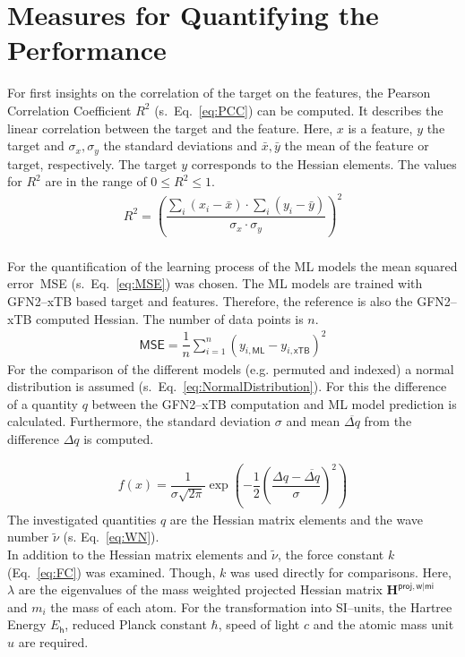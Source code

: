 \section{Measures for Quantifying the Performance}
\label{sec:Methods:Measures}
For first insights on the correlation of the target on the features, the Pearson Correlation Coefficient $R^2$ (s.~Eq.~\eqref{eq:PCC}) can be computed.
It describes the linear correlation between the target and the feature.
Here, $x$ is a feature, $y$ the target and $\sigma_x,\sigma_y$ the standard deviations and $\bar{x},\bar{y}$ the mean of the feature or target, respectively.
The target $y$ corresponds to the Hessian elements.
The values for $R^2$ are in the range of $0 \leq R^2 \leq 1$.
\begin{align}
	\label{eq:PCC}
	R^2 = \left(  \dfrac{\sum_i( x_i - \bar{x}) \cdot \sum_i (y_i - \bar{y})}{\sigma_x \cdot \sigma_y} \right)^2
\end{align}
\\
For the quantification of the learning process of the ML models the mean squared error~MSE (s.~Eq.~\eqref{eq:MSE}) was chosen.
The ML models are trained with \mbox{GFN2--xTB} based target and features. Therefore, the reference is also the \mbox{\mbox{GFN2--xTB}} computed Hessian.
The number of data points is $n$.
\begin{align}
	\label{eq:MSE}
	\mathsf{MSE} =  \dfrac{1}{n} \sum_{i=1}^n \left( y_{i\mathsf{,ML}} - y_{i\mathsf{,xTB}} \right)^2
\end{align}
For the comparison of the different models (e.g. \mbox{permuted} and \mbox{indexed}) a normal distribution is assumed (s.~Eq.~\eqref{eq:NormalDistribution}). 
For this the difference of a quantity $q$ between the \mbox{GFN2--xTB} computation and ML model prediction is calculated.
Furthermore, the standard deviation $\sigma$ and mean $\overline{\Delta q}$ from the difference $\Delta q$ is computed.

\begin{align}
	\label{eq:NormalDistribution}
	f(x)  = \dfrac{1}{\sigma \sqrt{2\pi}} \exp\left({-\dfrac{1}{2} \left(\dfrac{\Delta q-\overline{\Delta q}}{\sigma}\right)^2}\right)
\end{align}
The investigated quantities $q$ are the Hessian matrix elements and the wave number $\tilde{\nu}$ (s. Eq.~\eqref{eq:WN}).\\
In addition to the Hessian matrix elements and $\tilde{\nu}$, the force constant $k$ (Eq.~\eqref{eq:FC}) was examined. Though, $k$ was used directly for comparisons.
Here, $\lambda$ are the eigenvalues of the mass weighted projected Hessian matrix $\textbf{H}^\mathsf{proj,w|mi}$ and $m_i$ the mass of each atom.
For the transformation into SI--units, the Hartree Energy $E_\mathsf{h}$,
reduced Planck constant $\hbar$, speed of light $c$ and the atomic mass unit $u$ are required.

